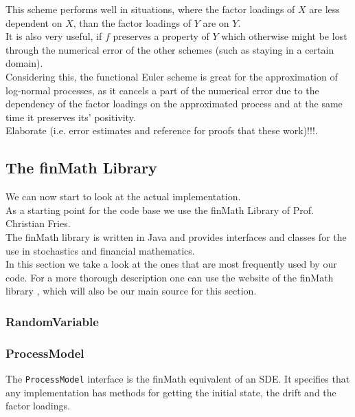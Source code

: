 \documentclass[12pt]{article}
\newcommand{\finmathlib}{C:/Users/marku/IdeaProjects/finmath-lib/src/main/java/net/finmath}
\newcommand{\libMC}{\finmathlib/montecarlo}
\begin{document}
	This scheme performs well in situations, where the factor loadings of $X$ are less dependent on $X$, than the factor loadings of $Y$ are on $Y$.\\
	It is also very useful, if $f$ preserves a property of $Y$ which otherwise might be lost through the numerical error of the other schemes (such as staying in a certain domain).\\
	Considering this, the functional Euler scheme is great for the approximation of log-normal processes, as it cancels a part of the numerical error due to the dependency of the factor loadings on the approximated process and at the same time it preserves its' positivity.\\
	\color{red}Elaborate (i.e. error estimates and reference for proofs that these work)!!!\color{black}. 
	
	\subsection{The finMath Library}
	We can now start to look at the actual implementation.\\
	As a starting point for the code base we use the finMath Library of Prof. Christian Fries.\\
	The finMath library is written in Java and provides interfaces and classes for the use in stochastics and financial mathematics.\\
	In this section we take a look at the ones that are most frequently used by our code. For a more thorough description one can use the website of the finMath library \cite{finmathWebsite}, which will also be our main source for this section.
	\subsubsection*{RandomVariable}
	\subsubsection*{ProcessModel}
	The \texttt{ProcessModel} interface is the finMath equivalent of an SDE. It specifies that any implementation has methods for getting the initial state, the drift and the factor loadings.
	
	
	
\end{document}
